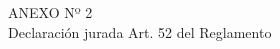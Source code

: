 \begin{center}
    \vspace*{\fill} %
    \Huge %
    ANEXO Nº 2 \\
    Declaración jurada Art. 52 del Reglamento
    \vspace*{\fill} %
\end{center}
